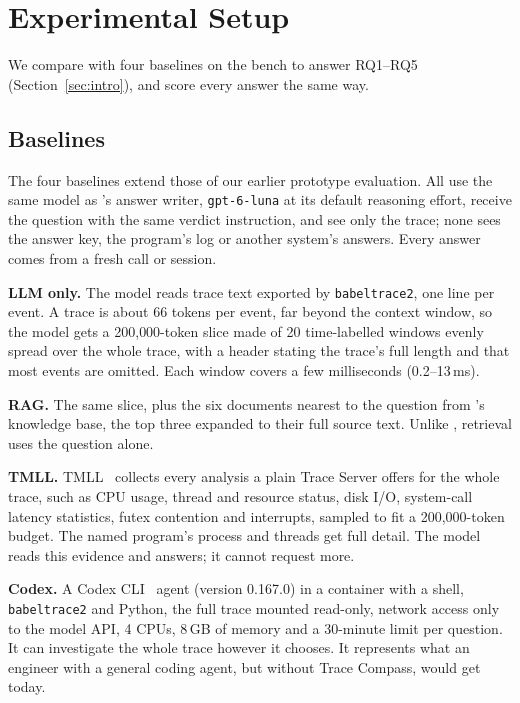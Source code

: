 \section{Experimental Setup}
\label{sec:setup}

We compare \sysname with four baselines on the bench to answer RQ1--RQ5 (Section~\ref{sec:intro}), and score every answer the same way.

\subsection{Baselines}

The four baselines extend those of our earlier prototype evaluation. All use the same model as \sysname's answer writer, \texttt{gpt-6-luna} at its default reasoning effort, receive the question with the same verdict instruction, and see only the trace; none sees the answer key, the program's log or another system's answers. Every answer comes from a fresh call or session.

\textbf{LLM only.} The model reads trace text exported by \texttt{babeltrace2}, one line per event. A trace is about 66 tokens per event, far beyond the context window, so the model gets a 200{,}000-token slice made of 20 time-labelled windows evenly spread over the whole trace, with a header stating the trace's full length and that most events are omitted. Each window covers a few milliseconds (0.2--13\,ms).

\textbf{RAG.} The same slice, plus the six documents nearest to the question from \sysname's knowledge base, the top three expanded to their full source text. Unlike \sysname, retrieval uses the question alone.

\textbf{TMLL.} TMLL~\cite{shahedi2025tmll} collects every analysis a plain Trace Server offers for the whole trace, such as CPU usage, thread and resource status, disk I/O, system-call latency statistics, futex contention and interrupts, sampled to fit a 200{,}000-token budget. The named program's process and threads get full detail. The model reads this evidence and answers; it cannot request more.

\textbf{Codex.} A Codex CLI~\cite{codexcli} agent (version 0.167.0) in a container with a shell, \texttt{babeltrace2} and Python, the full trace mounted read-only, network access only to the model API, 4 CPUs, 8\,GB of memory and a 30-minute limit per question. It can investigate the whole trace however it chooses. It represents what an engineer with a general coding agent, but without Trace Compass, would get today.

